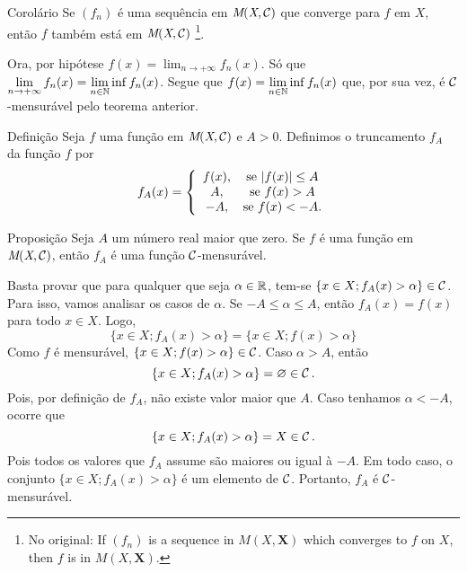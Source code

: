 \begin{env}{Corolário}
	\label{cor:convergencia-de-uma-sequencia-mensuravel}
	Se $(f_n)$ é uma sequência em $\operatorname{\textit{M}(\textit{X}, \mathcal{C} )}$ que converge para $f$ em $X$, então
	$f$ também está em $\operatorname{\textit{M}(\textit{X}, \mathcal{C} )}$
	\cite[p. 12, tradução nossa, adaptação nossa]{bartle}
	\footnote{No original:
		If $(f_n)$ is a sequence in $M(X, \textbf{X})$ which converges to $f$ on $X$, 
		then $f$ is in $M(X, \textbf{X})$.
	}.
	
\end{env}
\begin{prova}
	Ora, por hipótese $\displaystyle f(x) = \lim_{n \to +\infty} f_n(x)$.
	Só que $\displaystyle \lim_{n \to +\infty} f_n(x) = \lim_{n \in \operatorname{\mathbb{N}}} \inf f_n(x)$.
	Segue que $\displaystyle f(x) = \lim_{n \in \operatorname{\mathbb{N}}} \inf f_n(x)$ que, por sua vez, é $\operatorname{\mathcal{C}}$-mensurável pelo teorema anterior.
\end{prova}

\begin{env}{Definição}
	Seja $f$ uma função em $\operatorname{\textit{M}(\textit{X}, \mathcal{C} )}$ e $A > 0$.
	Definimos o truncamento $f_A$ da função $f$ por
	$$ f_A(x) =
	\left\{\begin{array}{cc}
		f(x), & \textrm{se\ } |f(x)| \leq A \\
		A, & \textrm{se\ } f(x) > A \\
		-A, & \textrm{se\ } f(x) < -A.
	\end{array}\right.
	\vspace{-0.4cm}
	$$
\end{env}
\begin{env}{Proposição}
	\label{prop:truncamento-mensurável}
	Seja $A$ um número real maior que zero.
	Se $f$ é uma função em $\operatorname{\textit{M}(\textit{X}, \mathcal{C} )}$, então $f_A$ é uma função $\operatorname{\mathcal{C}}$-mensurável.
\end{env}
\begin{prova}
	Basta provar que para qualquer que seja $\alpha \in \mathbb{R}$, tem-se $\{x \in X; f_A(x) > \alpha\} \in \operatorname{\mathcal{C}}$.
	Para isso, vamos analisar os casos de $\alpha$.
	Se $-A \leq \alpha \leq A$, então $f_A(x) = f(x)$ para todo $x \in X$.
	Logo, 
	$$
	\{x \in X; f_A(x) > \alpha \} = \{x \in X; f(x) > \alpha \}
	$$
	Como $f$ é mensurável, $\{x \in X; f(x) > \alpha \} \in \operatorname{\mathcal{C}}$.
	Caso $\alpha > A$, então
	$$
	\{x \in X; f_A(x) > \alpha \} = \varnothing \in \operatorname{\mathcal{C}}.
	$$
	Pois, por definição de $f_A$, não existe valor maior que $A$.
	Caso tenhamos $\alpha < -A$, ocorre que
	$$
	\{x \in X; f_A(x) > \alpha \} = X \in \operatorname{\mathcal{C}}.
	$$
	Pois todos os valores que $f_A$ assume são maiores ou igual à $-A$.
	Em todo caso, o conjunto $\{x \in X; f_A(x) > \alpha\}$ é um elemento de $\operatorname{\mathcal{C}}$.
	Portanto, $f_A$ é $\operatorname{\mathcal{C}}$-mensurável. 
\end{prova}

